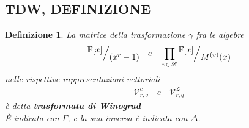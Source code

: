 \documentclass[mathserif]{beamer}
\def\quotient#1#2{%
   \raise1ex\hbox{$#1$}\Big/\lower1ex\hbox{$#2$}%
}
\newtheorem{definizione}{Definizione}
\begin{document}
\subsection{TDW, DEFINIZIONE}
\begin{frame}
    \begin{definizione}
      La matrice della trasformazione $\gamma$ fra le algebre
      \begin{align*}
         \quotient{\mathbb{F} \lbrack x \rbrack  }{ (x^{r} - 1)} 
         \quad 
         e 
         \quad 
         \prod_{v\in \mathscr{L}} \quotient{\mathbb{F} \lbrack x \rbrack  }{M^{(v)}(x)}
      \end{align*}
      nelle rispettive rappresentazioni vettoriali 
      \begin{align*}
         \mathcal{V}_{r, q}^{c} \quad e \quad \mathcal{V}_{r,q}^{\mathscr{L}}
      \end{align*}      
      è detta {\bf trasformata di Winograd} \\
      È indicata con $\Gamma$, e la sua inversa è indicata con $\Delta$.
    \end{definizione}
\end{frame}
\end{document}
